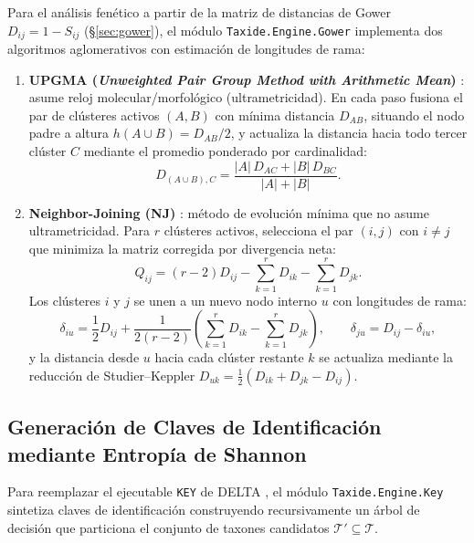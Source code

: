 \documentclass[11pt,a4paper]{article}
\theoremstyle{definition}
\theoremstyle{remark}
\begin{document}
Para el análisis fenético a partir de la matriz de distancias de Gower $D_{ij} = 1 - S_{ij}$ (\S\ref{sec:gower}), el módulo \texttt{Taxide.Engine.Gower} implementa dos algoritmos aglomerativos con estimación de longitudes de rama:
\begin{enumerate}
    \item \textbf{UPGMA (\textit{Unweighted Pair Group Method with Arithmetic Mean})} \cite{sokal1958}: asume reloj molecular/morfológico (ultrametricidad). En cada paso fusiona el par de clústeres activos $(A, B)$ con mínima distancia $D_{AB}$, situando el nodo padre a altura $h(A \cup B) = D_{AB}/2$, y actualiza la distancia hacia todo tercer clúster $C$ mediante el promedio ponderado por cardinalidad:
    \begin{equation}
    \label{eq:upgma}
    D_{(A \cup B), C} = \frac{|A| \, D_{AC} + |B| \, D_{BC}}{|A| + |B|}.
    \end{equation}
    \item \textbf{Neighbor-Joining (NJ)} \cite{saitou1987}: método de evolución mínima que no asume ultrametricidad. Para $r$ clústeres activos, selecciona el par $(i, j)$ con $i \neq j$ que minimiza la matriz corregida por divergencia neta:
    \begin{equation}
    \label{eq:nj_q}
    Q_{ij} = (r - 2) D_{ij} - \sum_{k=1}^r D_{ik} - \sum_{k=1}^r D_{jk}.
    \end{equation}
    Los clústeres $i$ y $j$ se unen a un nuevo nodo interno $u$ con longitudes de rama:
    \begin{equation}
    \label{eq:nj_branch}
    \delta_{iu} = \frac{1}{2} D_{ij} + \frac{1}{2(r - 2)} \left( \sum_{k=1}^r D_{ik} - \sum_{k=1}^r D_{jk} \right), \qquad \delta_{ju} = D_{ij} - \delta_{iu},
    \end{equation}
    y la distancia desde $u$ hacia cada clúster restante $k$ se actualiza mediante la reducción de Studier--Keppler $D_{uk} = \frac{1}{2}(D_{ik} + D_{jk} - D_{ij})$.
\end{enumerate}

\subsection{Generación de Claves de Identificación mediante Entropía de Shannon}
\label{sec:claves}
Para reemplazar el ejecutable \texttt{KEY} de DELTA \cite{dallwitz1974}, el módulo \texttt{Taxide.Engine.Key} sintetiza claves de identificación construyendo recursivamente un árbol de decisión que particiona el conjunto de taxones candidatos $\mathcal{T}' \subseteq \mathcal{T}$.
\end{document}
